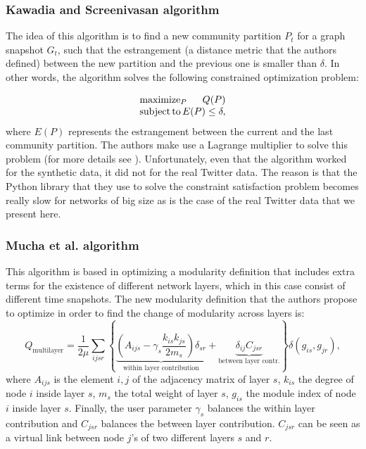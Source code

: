 \documentclass[12pt]{article}
\begin{document}
\subsubsection{Kawadia and Screenivasan algorithm}

The idea of this algorithm is to find a new community partition $P_t$ for a graph snapshot $G_t$, such that the estrangement (a distance
metric that the authors defined) between the new partition and the
previous one is smaller than $\delta$. In other words, the algorithm solves
the following constrained optimization problem:

\begin{equation}
\begin{array}{l}
\operatorname*{maximize}_{P} \hfill Q(P)\\
\operatorname*{subject\, to} \hfill E(P) \le \delta,
\end{array} 
\label{eq.opt}
\end{equation}
where $E(P)$ represents the estrangement between the current
and the last community partition. The authors make use a Lagrange
multiplier to solve this problem (for more details see \cite{kawadia2012sequential}). Unfortunately, even that the algorithm
worked for the synthetic data, it did not for the real Twitter
data. The reason is that the Python library that
they use to solve the constraint satisfaction problem becomes really
slow for networks of big size as is the case of the real Twitter data
that we present here.

\subsubsection{Mucha et al. algorithm}

This algorithm is based in optimizing a modularity definition that
includes extra terms for the existence of different network layers,
which in this case consist of different time snapshots. The new
modularity definition that the authors propose to optimize
in order to find the change of modularity across layers is:
\begin{equation}
Q_{\text{multilayer}} = \frac{1}{2\mu} 
\sum_{ijsr} \left\{ \underbrace{ \left( 
A_{ijs}
 - \gamma_s \frac{k_{is} k_{js}}{2m_s}\right) \delta_{sr} 
 }_{\text{within layer contribution}}
 + \underbrace{\delta_{ij} C_{jsr}}_{\text{between layer contr.}}
 \right\} \delta(g_{is},g_{jr}),
\label{eq.q.layers}
\end{equation}
where $A_{ijs}$ is the element $i,j$ of the adjacency matrix of layer
$s$, $k_{is}$ the degree of node $i$ inside layer $s$, $m_s$ the
total weight of layer $s$, $g_{is}$ the module index of node $i$ inside
layer $s$. Finally, the user parameter $\gamma_s$ balances
the within layer contribution and $C_{jsr}$ balances the
between layer contribution. $C_{jsr}$ can be seen as a virtual
link between node $j$'s of two different layers $s$ and $r$.
\end{document}
